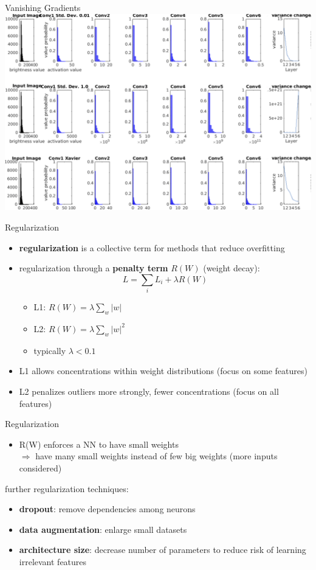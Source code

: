 \documentclass{beamer}
\begin{document}
\begin{frame}{Vanishing Gradients}
\includegraphics[width=1\textwidth]{vanishing}
\end{frame}


\begin{frame}{Regularization}
\begin{itemize}
\item \textbf{regularization} is a collective term for methods that reduce overfitting
\item regularization through a \textbf{penalty term} $R(W)$ (weight decay):
\begin{equation}
 L = \sum_i L_i + \lambda R(W)
\end{equation}

\begin{itemize}
\item L1: $R(W) = \lambda \sum_w |w|$
\item L2: $R(W) = \lambda \sum_w |w|^2$
\item typically $\lambda < 0.1$
\end{itemize}
\item L1 allows concentrations within weight distributions (focus on some features)
\item L2 penalizes outliers more strongly, fewer concentrations (focus on all features)
\end{itemize}
\end{frame}


\begin{frame}{Regularization}
\begin{itemize}
\item R(W) enforces a NN to have small weights\\
$\Rightarrow$ have many small weights instead of few big weights (more inputs considered)
\end{itemize}
further regularization techniques:
\begin{itemize}
\item \textbf{dropout}: remove dependencies among neurons
\item \textbf{data augmentation}: enlarge small datasets
\item \textbf{architecture size}: decrease number of parameters to reduce risk of learning irrelevant features 
\end{itemize}
\end{frame}
\end{document}
